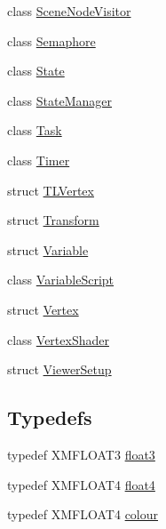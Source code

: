 \begin{DoxyCompactItemize}
class \hyperlink{classmage_1_1_scene_node_visitor}{Scene\+Node\+Visitor}
\item 
class \hyperlink{classmage_1_1_semaphore}{Semaphore}
\item 
class \hyperlink{classmage_1_1_state}{State}
\item 
class \hyperlink{classmage_1_1_state_manager}{State\+Manager}
\item 
class \hyperlink{classmage_1_1_task}{Task}
\item 
class \hyperlink{classmage_1_1_timer}{Timer}
\item 
struct \hyperlink{structmage_1_1_t_l_vertex}{T\+L\+Vertex}
\item 
struct \hyperlink{structmage_1_1_transform}{Transform}
\item 
struct \hyperlink{structmage_1_1_variable}{Variable}
\item 
class \hyperlink{classmage_1_1_variable_script}{Variable\+Script}
\item 
struct \hyperlink{structmage_1_1_vertex}{Vertex}
\item 
class \hyperlink{classmage_1_1_vertex_shader}{Vertex\+Shader}
\item 
struct \hyperlink{structmage_1_1_viewer_setup}{Viewer\+Setup}
\end{DoxyCompactItemize}
\subsection*{Typedefs}
\begin{DoxyCompactItemize}
\item 
typedef X\+M\+F\+L\+O\+A\+T3 \hyperlink{namespacemage_aab5dae4b0aaf8129b9e0d651d91d4b38}{float3}
\item 
typedef X\+M\+F\+L\+O\+A\+T4 \hyperlink{namespacemage_aa79484ea5211c29727b3794199ac0a55}{float4}
\item 
typedef X\+M\+F\+L\+O\+A\+T4 \hyperlink{namespacemage_a2d4dece8fe175b32167f9a7b925adc7c}{colour}
\end{DoxyCompactItemize}
